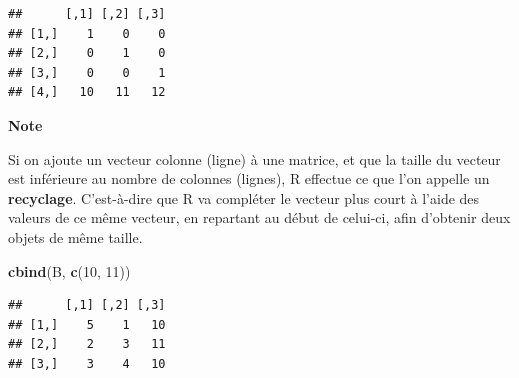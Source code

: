 \documentclass[
  11pt,
]{book}
\newenvironment{Shaded}{\begin{snugshade}}{\end{snugshade}}
\newcommand{\DecValTok}[1]{\textcolor[rgb]{0.00,0.00,0.81}{#1}}
\newcommand{\FunctionTok}[1]{\textcolor[rgb]{0.13,0.29,0.53}{\textbf{#1}}}
\newcommand{\NormalTok}[1]{#1}
\numberwithin{equation}{section}
\numberwithin{countremarque}{section}
\newenvironment{notebox}{
  \begin{tcolorbox}[breakable, colback=jaune,coltext=black,
                  colframe=grisfonce]}
 {\end{tcolorbox}}
\begin{document}
\begin{lstlisting}
##      [,1] [,2] [,3]
## [1,]    1    0    0
## [2,]    0    1    0
## [3,]    0    0    1
## [4,]   10   11   12
\end{lstlisting}

\begin{notebox}

\textbf{Note}

Si on ajoute un vecteur colonne (ligne) à une matrice, et que la taille du vecteur est inférieure au nombre de colonnes (lignes), R effectue ce que l'on appelle un \textbf{recyclage}. C'est-à-dire que R va compléter le vecteur plus court à l'aide des valeurs de ce même vecteur, en repartant au début de celui-ci, afin d'obtenir deux objets de même taille.

\begin{Shaded}
\begin{Highlighting}[]
\FunctionTok{cbind}\NormalTok{(B, }\FunctionTok{c}\NormalTok{(}\DecValTok{10}\NormalTok{, }\DecValTok{11}\NormalTok{))}
\end{Highlighting}
\end{Shaded}

\begin{lstlisting}
##      [,1] [,2] [,3]
## [1,]    5    1   10
## [2,]    2    3   11
## [3,]    3    4   10
\end{lstlisting}

\end{notebox}
\end{document}
